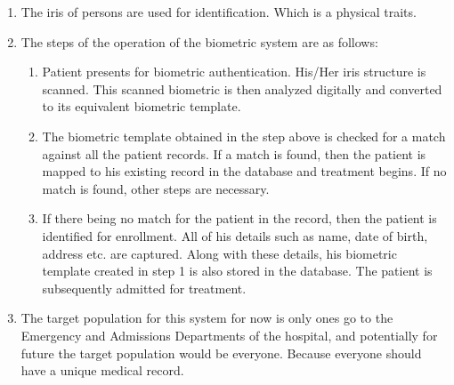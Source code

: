 \documentclass[a4paper]{article}
\begin{document}
\begin{spacing}{2.0}
\begin{enumerate}
\begin{enumerate}
\begin{enumerate}
\end{enumerate}
\item The iris of persons are used for identification. Which is a physical traits.
\item The steps of the operation of the biometric system are as follows:
\begin{enumerate}
\item Patient presents for biometric authentication. His/Her iris structure is scanned. This scanned biometric is then analyzed digitally and converted to its equivalent biometric template.
\item The biometric template obtained in the step above is checked for a match against all the patient records. If a match is found, then the patient is mapped to his existing record in the database and treatment begins. If no match is found, other steps are necessary.
\item If there being no match for the patient in the record, then the patient is identified for enrollment. All of his details such as name, date of birth, address etc. are captured. Along with these details, his biometric template created in step 1 is also stored in the database. The patient is subsequently admitted for treatment.
\end{enumerate}

\item The target population for this system for now is only ones go to the Emergency and Admissions Departments of the hospital, and potentially for future the target population would be everyone. Because everyone should have a unique medical record.


\end{enumerate}
\end{enumerate}
\end{spacing}
\end{document}
